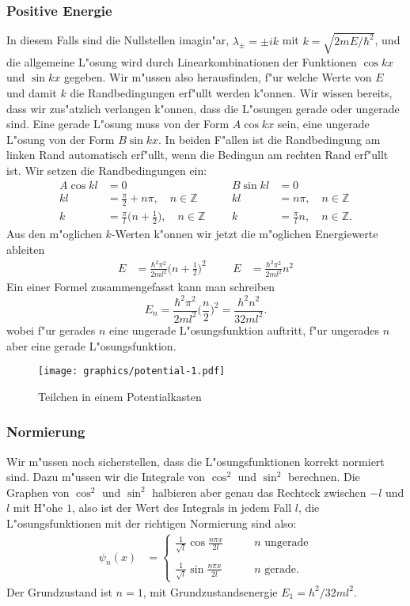 \subsubsection{Positive Energie}
In diesem Falls sind die Nullstellen imagin"ar, $\lambda_\pm=\pm ik$
mit $k=\sqrt{2mE/\hbar^2}$,
und die allgemeine L"osung wird durch Linearkombinationen der Funktionen
$\cos kx$ und $\sin kx$ gegeben.
Wir m"ussen also herausfinden, f"ur welche Werte von $E$ und damit $k$
die Randbedingungen erf"ullt werden k"onnen.
Wir wissen bereits, dass wir zus"atzlich verlangen k"onnen, dass die
L"osungen gerade oder ungerade sind.
Eine gerade L"osung muss von der Form $A\cos kx$ sein, eine ungerade
L"osung von der Form $B\sin kx$.
In beiden F"allen ist die Randbedingung am linken Rand automatisch
erf"ullt, wenn die Bedingun am rechten Rand erf"ullt ist.
Wir setzen die Randbedingungen ein:
\begin{align*}
A\cos kl&=0
	&&&
		B\sin kl&=0\\
kl&=\frac{\pi}2+n\pi,\quad n\in\mathbb Z
	&&&
		kl&=n\pi,\quad n\in\mathbb Z\\
k&=\frac{\pi}{l}\biggl(n+\frac12\biggr),\quad n\in\mathbb Z
	&&&
		k&=\frac{\pi}{l}n,\quad n\in\mathbb Z.
\end{align*}
Aus den m"oglichen $k$-Werten k"onnen wir jetzt die m"oglichen 
Energiewerte ableiten
\begin{align*}
E&=\frac{\hbar^2\pi^2}{2ml^2}\biggl(n+\frac12\biggr)^2
&&&
E&=\frac{\hbar^2\pi^2}{2ml^2}n^2
\end{align*}
Ein einer Formel zusammengefasst kann man schreiben
\[
E_n
=
\frac{\hbar^2\pi^2}{2ml^2}\biggl(\frac{n}{2}\biggr)^2
=
\frac{h^2n^2}{32ml^2}.
\]
wobei f"ur gerades $n$ eine ungerade L"osungsfunktion auftritt,
f"ur ungerades $n$ aber eine gerade L"osungsfunktion.
\begin{figure}
\centering
\texttt{[image: graphics/potential-1.pdf]}
\caption{Teilchen in einem Potentialkasten
\label{potentialkasten}}
\end{figure}

\subsubsection{Normierung}
Wir m"ussen noch sicherstellen, dass die L"osungsfunktionen korrekt
normiert sind.
Dazu m"ussen wir die Integrale von $\cos^2$ und $\sin^2$ berechnen.
Die Graphen von $\cos^2$ und $\sin^2$ halbieren aber genau das
Rechteck zwischen $-l$ und $l$ mit H"ohe $1$, also ist der Wert
des Integrals in jedem Fall $l$, die L"osungsfunktionen mit
der richtigen Normierung sind also:
\begin{align*}
\psi_n(x)
&=
\begin{cases}
\displaystyle
\frac{1}{\sqrt{l}}\cos\frac{n \pi x}{2l}&\qquad \text{$n$ ungerade}\\
\\
\displaystyle
\frac{1}{\sqrt{l}}\sin\frac{n \pi x}{2l}&\qquad \text{$n$ gerade}.
\end{cases}
\end{align*}
Der Grundzustand ist $n=1$, mit Grundzustandsenergie $E_1=h^2/32ml^2$.

